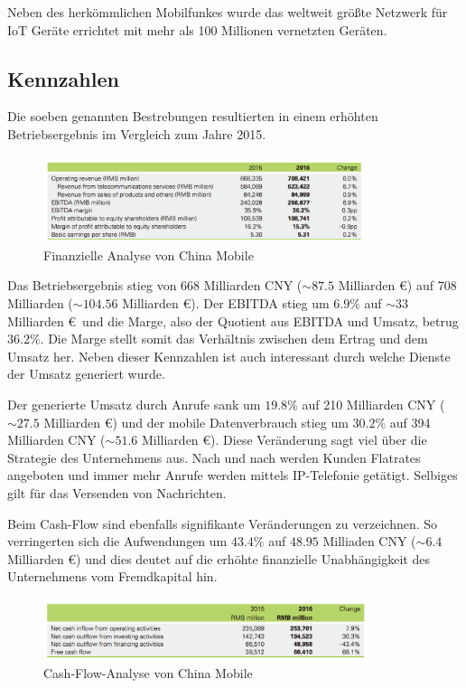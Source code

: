 Neben des herkömmlichen Mobilfunkes wurde das weltweit größte Netzwerk für IoT Geräte errichtet mit mehr als 100 Millionen vernetzten Geräten. 

\subsection{Kennzahlen}

Die soeben genannten Bestrebungen resultierten in einem erhöhten Betriebsergebnis im Vergleich zum Jahre 2015.

\begin{figure}[H]
\centering
\includegraphics[width=0.85\textwidth]{pictures/finances}
\caption{Finanzielle Analyse von China Mobile}
\label{fig:lteplus}
\end{figure}

Das Betriebsergebnis stieg von 668 Milliarden CNY ($\sim 87.5$ Milliarden \euro) auf 708 Milliarden ($\sim 104.56$ Milliarden \euro). Der EBITDA stieg um $6.9\%$ auf $\sim 33$ Milliarden \euro \ und die Marge, also der Quotient aus EBITDA und Umsatz, betrug $36.2\%$. Die Marge stellt somit das Verhältnis zwischen dem Ertrag und dem Umsatz her. Neben dieser Kennzahlen ist auch interessant durch welche Dienste der Umsatz generiert wurde. 

Der generierte Umsatz durch Anrufe sank um $19.8\%$ auf 210 Milliarden CNY ($\sim 27.5$ Milliarden \euro) und der mobile Datenverbrauch stieg um $30.2\%$ auf 394 Milliarden CNY ($\sim 51.6$ Milliarden \euro). Diese Veränderung sagt viel über die Strategie des Unternehmens aus. Nach und nach werden Kunden Flatrates angeboten und immer mehr Anrufe werden mittels IP-Telefonie getätigt. Selbiges gilt für das Versenden von Nachrichten.  

Beim Cash-Flow sind ebenfalls signifikante Veränderungen zu verzeichnen. So verringerten sich die Aufwendungen um $43.4\%$ auf $48.95$ Milliaden CNY ($\sim 6.4$ Milliarden \euro) und dies deutet auf die erhöhte finanzielle Unabhängigkeit des Unternehmens vom Fremdkapital hin.

\begin{figure}[H]
\centering
\includegraphics[width=0.85\textwidth]{pictures/cashflow}
\caption{Cash-Flow-Analyse von China Mobile}
\label{fig:lteplus}
\end{figure}


